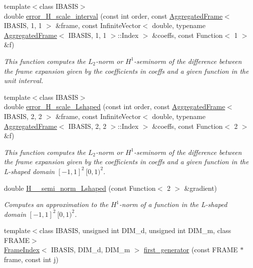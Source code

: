 \begin{CompactItemize}
\item 
{\footnotesize template$<$class IBASIS$>$ }\\double \hyperlink{namespaceFrameTL_addaaee53d308a6093a25ed95f86cc85}{error\_\-H\_\-scale\_\-interval} (const int order, const \hyperlink{classFrameTL_1_1AggregatedFrame}{AggregatedFrame}$<$ IBASIS, 1, 1 $>$ \&frame, const InfiniteVector$<$ double, typename \hyperlink{classFrameTL_1_1AggregatedFrame}{AggregatedFrame}$<$ IBASIS, 1, 1 $>$::Index $>$ \&coeffs, const Function$<$ 1 $>$ \&f)
\begin{CompactList}\small\item\em This function computes the $L_2$-norm or $H^1$-seminorm of the difference between the frame expansion given by the coefficients in coeffs and a given function in the unit interval. \item\end{CompactList}\item 
{\footnotesize template$<$class IBASIS$>$ }\\double \hyperlink{namespaceFrameTL_54aa679fc30456b9ca268846c1926992}{error\_\-H\_\-scale\_\-Lshaped} (const int order, const \hyperlink{classFrameTL_1_1AggregatedFrame}{AggregatedFrame}$<$ IBASIS, 2, 2 $>$ \&frame, const InfiniteVector$<$ double, typename \hyperlink{classFrameTL_1_1AggregatedFrame}{AggregatedFrame}$<$ IBASIS, 2, 2 $>$::Index $>$ \&coeffs, const Function$<$ 2 $>$ \&f)
\begin{CompactList}\small\item\em This function computes the $L_2$-norm or $H^1$-seminorm of the difference between the frame expansion given by the coefficients in coeffs and a given function in the L-shaped domain $[-1,1]^2 \ [0,1)^2$. \item\end{CompactList}\item 
double \hyperlink{namespaceFrameTL_3ce808a3f26fc1938139488a730e994d}{H\_\_\-semi\_\-norm\_\-Lshaped} (const Function$<$ 2 $>$ \&gradient)
\begin{CompactList}\small\item\em Computes an approximation to the $H^1$-norm of a function in the L-shaped domain $[-1,1]^2 \ [0,1)^2$. \item\end{CompactList}\item 
{\footnotesize template$<$class IBASIS, unsigned int DIM\_\-d, unsigned int DIM\_\-m, class FRAME$>$ }\\\hyperlink{classFrameTL_1_1FrameIndex}{FrameIndex}$<$ IBASIS, DIM\_\-d, DIM\_\-m $>$ \hyperlink{namespaceFrameTL_6f69a38cdff114000317fd48750b471b}{first\_\-generator} (const FRAME $\ast$frame, const int j)

\end{CompactItemize}
